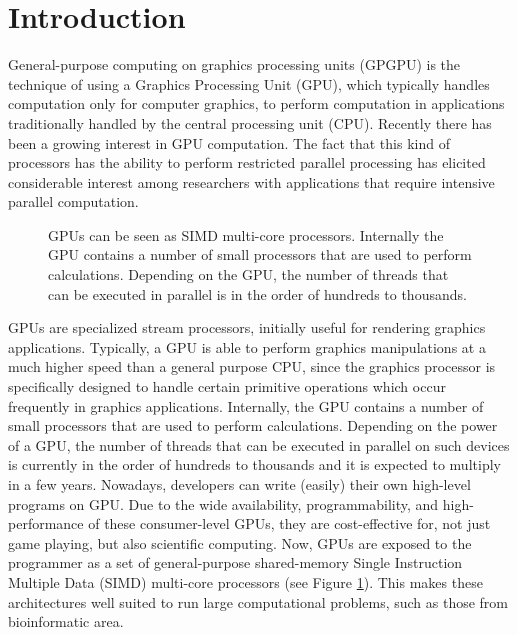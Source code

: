 \documentclass[prodmode,acmtecs]{acmsmall}
\begin{document}
\maketitle

\section{Introduction}
\label{sec:intro}

General-purpose computing on graphics processing units (GPGPU) is the technique of using a Graphics Processing Unit (GPU), which typically handles computation only for computer graphics, to perform computation in applications traditionally handled by the central processing unit (CPU). Recently there has been a growing interest in GPU computation. The fact that this kind of processors has the ability to perform restricted parallel processing has elicited considerable interest among researchers with applications that require intensive parallel computation.

\begin{figure}[ht]
\centerline{}
\caption{GPUs can be seen as SIMD multi-core processors. Internally the GPU contains a number of small processors that are used to perform calculations. Depending on the GPU, the number of threads that can be executed in parallel is in the order of hundreds to thousands.}
\label{figure:openclfigure2small}
\end{figure}

GPUs are specialized stream processors, initially useful for rendering graphics applications. Typically, a GPU is able to perform graphics manipulations at a much higher speed than a general purpose CPU, since the graphics processor is specifically designed to handle certain primitive operations which occur frequently in graphics applications. Internally, the GPU contains a number of small processors that are used to perform calculations. 
Depending on the power of a GPU, the number of threads that can be executed in parallel on such devices is currently in the order of hundreds to thousands and it is expected to multiply in a few years. Nowadays, developers can write (easily) their own high-level programs on GPU. Due to the wide availability, programmability, and high-performance of these consumer-level GPUs, they are cost-effective for, not just game playing, but also scientific computing.
Now, GPUs are exposed to the programmer as a set of general-purpose shared-memory Single Instruction Multiple Data (SIMD) multi-core processors (see Figure \ref{figure:openclfigure2small}). This makes these architectures well suited to run large computational problems, such as those from bioinformatic area. 
\end{document}
